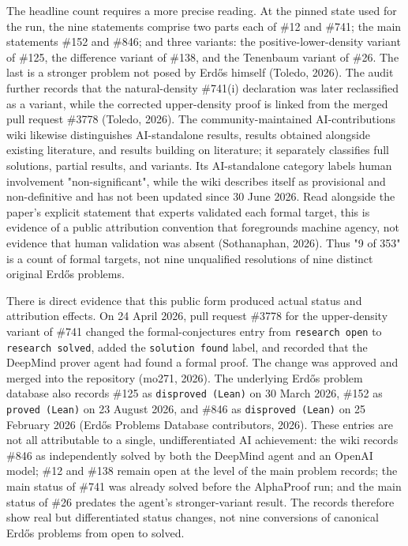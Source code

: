 \documentclass[pdflatex,sn-apa]{sn-jnl}
\begin{document}
The headline count requires a more precise reading. At the pinned state used for the run, the nine statements comprise two parts each of \#12 and \#741; the main statements \#152 and \#846; and three variants: the positive-lower-density variant of \#125, the difference variant of \#138, and the Tenenbaum variant of \#26. The last is a stronger problem not posed by Erdős himself (Toledo, 2026). The audit further records that the natural-density \#741(i) declaration was later reclassified as a variant, while the corrected upper-density proof is linked from the merged pull request \#3778 (Toledo, 2026). The community-maintained AI-contributions wiki likewise distinguishes AI-standalone results, results obtained alongside existing literature, and results building on literature; it separately classifies full solutions, partial results, and variants. Its AI-standalone category labels human involvement "non-significant", while the wiki describes itself as provisional and non-definitive and has not been updated since 30 June 2026. Read alongside the paper's explicit statement that experts validated each formal target, this is evidence of a public attribution convention that foregrounds machine agency, not evidence that human validation was absent (Sothanaphan, 2026). Thus "9 of 353" is a count of formal targets, not nine unqualified resolutions of nine distinct original Erdős problems.

There is direct evidence that this public form produced actual status and attribution effects. On 24 April 2026, pull request \#3778 for the upper-density variant of \#741 changed the formal-conjectures entry from \texttt{research open} to \texttt{research solved}, added the \texttt{solution found} label, and recorded that the DeepMind prover agent had found a formal proof. The change was approved and merged into the repository (mo271, 2026). The underlying Erdős problem database also records \#125 as \texttt{disproved (Lean)} on 30 March 2026, \#152 as \texttt{proved (Lean)} on 23 August 2026, and \#846 as \texttt{disproved (Lean)} on 25 February 2026 (Erdős Problems Database contributors, 2026). These entries are not all attributable to a single, undifferentiated AI achievement: the wiki records \#846 as independently solved by both the DeepMind agent and an OpenAI model; \#12 and \#138 remain open at the level of the main problem records; the main status of \#741 was already solved before the AlphaProof run; and the main status of \#26 predates the agent's stronger-variant result. The records therefore show real but differentiated status changes, not nine conversions of canonical Erdős problems from open to solved.
\end{document}

